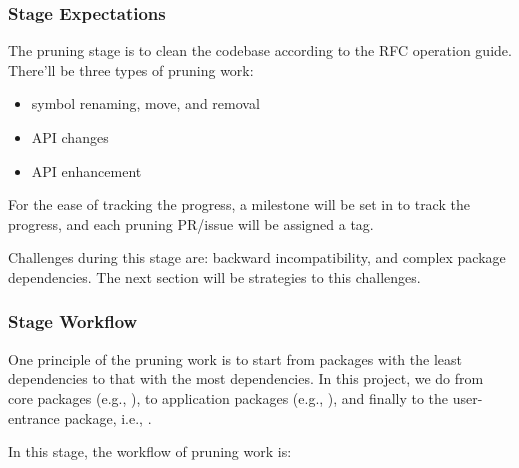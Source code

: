 \subsubsection*{Stage Expectations}

The pruning stage is to clean the codebase according to the RFC operation guide. There'll be three types of pruning work:
\begin{itemize}
    \item symbol renaming, move, and removal
    \item API changes
    \item API enhancement
\end{itemize}
For the ease of tracking the progress, a milestone will be set in \repoimages{} to track the progress, and each pruning PR/issue will be assigned a tag. \par

Challenges during this stage are: backward incompatibility, and complex package dependencies. The next section will be strategies to this challenges. \par

\subsubsection*{Stage Workflow}

One principle of the pruning work is to start from packages with the least dependencies to that with the most dependencies. In this project, we do from core packages (e.g., \repoimagecore{}), to application packages (e.g., \repoimagetransformations{}), and finally to the user-entrance package, i.e., \repoimages{}.\par

In this stage, the workflow of pruning work is:

